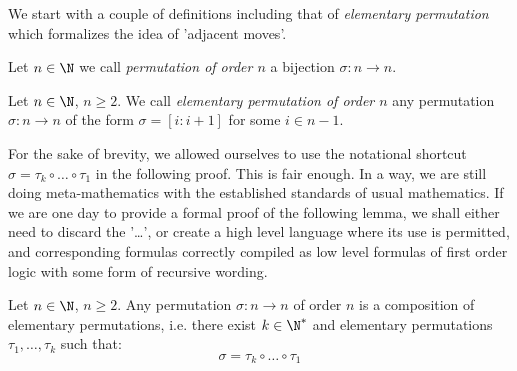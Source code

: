 We start with a couple of definitions including that of {\em
elementary permutation} which formalizes the idea of 'adjacent
moves'.
\begin{defin}\label{logic:def:integer:permutation}
Let $n\in\N$ we call {\em permutation of order $n$} a bijection
$\sigma:n\to n$.
\end{defin}
\begin{defin}\label{logic:def:elementary:permutation}
Let $n\in\N$, $n\geq 2$. We call {\em elementary permutation of
order $n$} any permutation $\sigma:n\to n$ of the form $\sigma=[i
:i+1]$ for some $i\in n-1$.
\end{defin}

For the sake of brevity, we allowed ourselves to use the notational
shortcut $\sigma = \tau_{k}\circ\ldots\circ\tau_{1}$ in the
following proof. This is fair enough. In a way, we are still doing
meta-mathematics with the established standards of usual
mathematics. If we are one day to provide a formal proof of the
following lemma, we shall either need to discard the '\ldots', or
create a high level language where its use is permitted, and
corresponding formulas correctly compiled as low level formulas of
first order logic with some form of recursive wording.
\begin{lemma}\label{logic:lemma:integer:permutation}
Let $n\in\N$, $n\geq 2$. Any permutation $\sigma:n\to n$ of order
$n$ is a composition of elementary permutations, i.e. there exist
$k\in\N^{*}$ and elementary permutations $\tau_{1},\ldots,\tau_{k}$
such that:
    \[
    \sigma = \tau_{k}\circ\ldots\circ\tau_{1}
    \]
\end{lemma}
